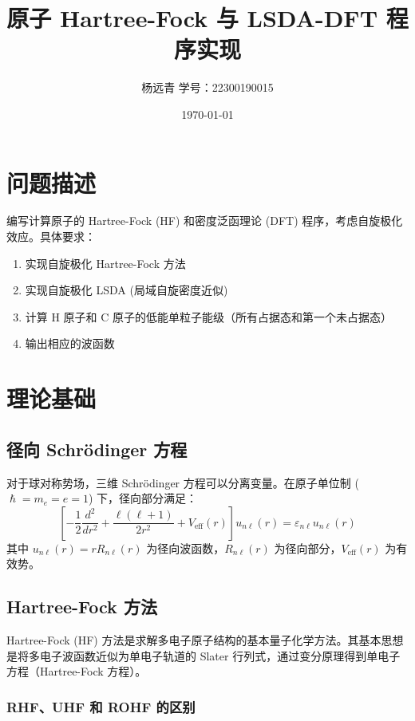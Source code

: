\documentclass[12pt,a4paper]{article}
\title{\vspace{-1cm}原子 Hartree-Fock 与 LSDA-DFT 程序实现}
\author{杨远青 \quad 学号：22300190015}
\date{\today}
\begin{document}
\maketitle

\section{问题描述}

编写计算原子的 Hartree-Fock (HF) 和密度泛函理论 (DFT) 程序，考虑自旋极化效应。具体要求：

\begin{enumerate}
    \item 实现自旋极化 Hartree-Fock 方法
    \item 实现自旋极化 LSDA (局域自旋密度近似)
    \item 计算 H 原子和 C 原子的低能单粒子能级（所有占据态和第一个未占据态）
    \item 输出相应的波函数
\end{enumerate}

\section{理论基础}

\subsection{径向 Schrödinger 方程}

对于球对称势场，三维 Schrödinger 方程可以分离变量。在原子单位制 ($\hslash = m_e = e = 1$) 下，径向部分满足：
\begin{equation}
    \left[ -\frac{1}{2}\frac{d^2}{dr^2} + \frac{\ell(\ell+1)}{2r^2} + V_{\text{eff}}(r) \right] u_{n\ell}(r) = \varepsilon_{n\ell} u_{n\ell}(r)
\end{equation}
其中 $u_{n\ell}(r) = r R_{n\ell}(r)$ 为径向波函数，$R_{n\ell}(r)$ 为径向部分，$V_{\text{eff}}(r)$ 为有效势。

\subsection{Hartree-Fock 方法}

Hartree-Fock (HF) 方法是求解多电子原子结构的基本量子化学方法。其基本思想是将多电子波函数近似为单电子轨道的 Slater 行列式，通过变分原理得到单电子方程（Hartree-Fock 方程）。

\subsubsection{RHF、UHF 和 ROHF 的区别}
\end{document}
